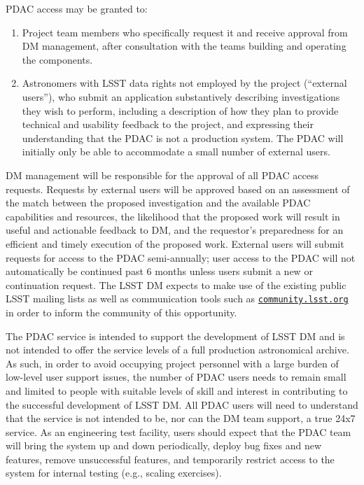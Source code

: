 \documentclass[DM,toc]{lsstdoc}
\begin{document}
PDAC access may be granted to:
\begin{enumerate}
\item Project team members who specifically request it and receive approval from DM management, after consultation with the teams building and operating the components.

\item Astronomers with LSST data rights not employed by the project (``external users''), who submit an application substantively describing investigations they wish to perform, including a description of how they plan to provide technical and usability feedback to the project, and expressing their understanding that the PDAC is not a production system. The PDAC will initially only be able to accommodate a small number of external users.
\end{enumerate}
DM management will be responsible for the approval of all PDAC access requests. Requests by external users will be approved based on an assessment of the match between the proposed investigation and the available PDAC capabilities and resources, the likelihood that the proposed work will result in useful and actionable feedback to DM, and the requestor's preparedness for an efficient and timely execution of the proposed work. External users will submit requests for access to the PDAC semi-annually; user access to the PDAC will not automatically be continued past 6 months unless users submit a new or continuation request. The LSST DM expects to make use of the existing public LSST mailing lists as well as communication tools such as \href{https://community.lsst.org}{\texttt{community.lsst.org}} in order to inform the community of this opportunity.

The PDAC service is intended to support the development of LSST DM and is not intended to offer the service levels of a full production astronomical archive. As such, in order to avoid occupying project personnel with a large burden of low-level user support issues, the number of PDAC users needs to remain small and limited to people with suitable levels of skill and interest in contributing to the successful development of LSST DM. All PDAC users will need to understand that the service is not intended to be, nor can the DM team support, a true 24x7 service. As an engineering test facility, users should expect that the PDAC team will bring the system up and down periodically, deploy bug fixes and new features, remove unsuccessful features, and temporarily restrict access to the system for internal testing (e.g., scaling exercises).
\end{document}
